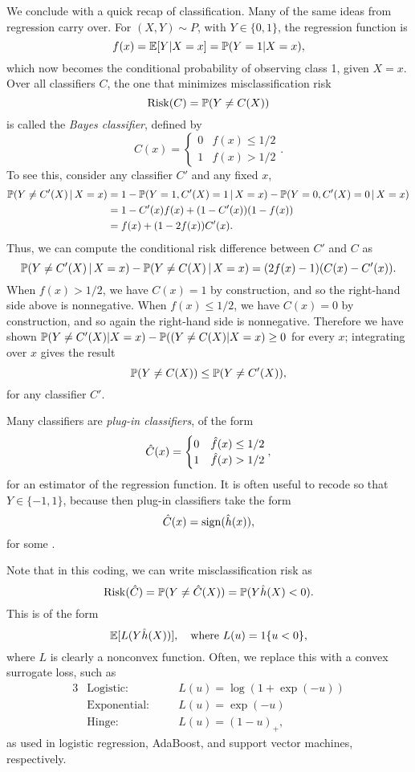 \documentclass{article}
\begin{document}
We conclude with a quick recap of classification. Many of the same ideas from
regression carry over. For $(X,Y) \sim P$, with $Y \in \{0,1\}$, the regression
function is 
\[
f(x) = \E[Y | X=x] = \P(Y=1 | X=x),
\]
which now becomes the conditional probability of observing class 1, given
$X=x$. Over all classifiers $C$, the one that minimizes misclassification risk 
\[
\Risk(C) = \P(Y \not= C(X))
\]
is called the \emph{Bayes classifier}, defined by 
\[
C(x) = 
\begin{cases}
0 & f(x) \leq 1/2 \\
1 & f(x) > 1/2
\end{cases}.
\]
To see this, consider any classifier $C'$ and any fixed $x$,
\begin{align*}
\P(Y \not= C'(X) \,|\, X=x) 
&= 1 - \P(Y=1, C'(X)=1 \,|\, X=x) - \P(Y=0, C'(X)=0 \,|\, X=x) \\ 
&= 1 - C'(x) f(x) + (1 - C'(x))(1 - f(x)) \\
&= f(x) + (1 - 2f(x))C'(x).
\end{align*}
Thus, we can compute the conditional risk difference between $C'$ and $C$ as
\[
\P(Y \not= C'(X) \,|\, X=x) - \P(Y \not= C(X) \,|\, X=x) 
= (2f(x)-1)(C(x)-C'(x)).
\]
When $f(x)>1/2$, we have $C(x)=1$ by construction, and so the right-hand side
above is nonnegative. When $f(x) \leq 1/2$, we have $C(x)=0$ by construction,
and so again the right-hand side is nonnegative. Therefore we have shown
$\P(Y \not= C'(X) | X=x) - \P((Y \not= C(X) | X=x) \geq 0$ for every $x$;
integrating over $x$ gives the result 
\[
\P(Y \not= C(X)) \leq \P(Y \not= C'(X)),
\]
for any classifier $C'$. 

Many classifiers are \emph{plug-in classifiers}, of the form 
\[
\hC(x) = 
\begin{cases}
0 & \hf(x) \leq 1/2 \\
1 & \hf(x) > 1/2
\end{cases},
\]
for an estimator \smash{$\hf$} of the regression function. It is often useful to 
recode so that $Y \in \{-1,1\}$, because then plug-in classifiers take the form  
\[
\hC(x) = \sign(\hh(x)),
\]
for some \smash{$\hh$}. 

Note that in this coding, we can write misclassification risk as 
\[
\Risk(\hC) = \P(Y \not= \hC(X)) = \P( Y \hh(X) < 0).
\]
This is of the form 
\[
\E[L(Y \hh(X))], \quad \text{where $L(u) = 1\{u < 0\}$},
\]
where $L$ is clearly a nonconvex function. Often, we replace this with a convex
surrogate loss, such as 
\begin{alignat*}{3}
&\text{Logistic}: \quad 
&& L(u) = \log(1 + \exp(-u)) \\
&\text{Exponential}: \quad 
&&L(u) = \exp(-u) \\
&\text{Hinge}: \quad 
&&L(u) = (1 - u)_+,
\end{alignat*}
as used in logistic regression, AdaBoost, and support vector machines,
respectively. 



\end{document}
